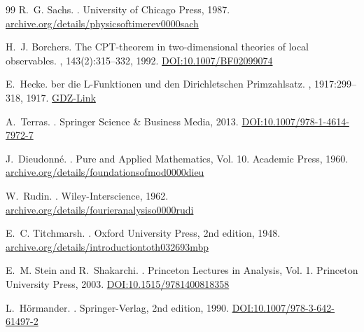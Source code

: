 \documentclass{article}
\numberwithin{equation}{section}
\theoremstyle{plain}
\theoremstyle{definition}
\theoremstyle{remark}
\begin{document}
\begin{thebibliography}{99}
R.~G. Sachs.
.
\newblock University of Chicago Press, 1987.
\href{https://archive.org/details/physicsoftimerev0000sach}{archive.org/details/physicsoftimerev0000sach}

H.~J. Borchers.
\newblock The CPT-theorem in two-dimensional theories of local observables.
, 143(2):315--332, 1992.
\href{https://doi.org/10.1007/BF02099074}{DOI:10.1007/BF02099074}

E.~Hecke.
ber die L-Funktionen und den Dirichletschen Primzahlsatz.
, 1917:299--318, 1917.
\href{http://resolver.sub.uni-goettingen.de/purl?GDZPPN002504953}{GDZ-Link}

A.~Terras.
.
\newblock Springer Science \& Business Media, 2013.
\href{https://doi.org/10.1007/978-1-4614-7972-7}{DOI:10.1007/978-1-4614-7972-7}

J.~Dieudonn{\'e}.
.
\newblock Pure and Applied Mathematics, Vol. 10. Academic Press, 1960.
\href{https://archive.org/details/foundationsofmod0000dieu}{archive.org/details/foundationsofmod0000dieu}

W.~Rudin.
.
\newblock Wiley-Interscience, 1962.
\href{https://archive.org/details/fourieranalysiso0000rudi}{archive.org/details/fourieranalysiso0000rudi}

E.~C. Titchmarsh.
.
\newblock Oxford University Press, 2nd edition, 1948.
\href{https://archive.org/details/introductiontoth032693mbp}{archive.org/details/introductiontoth032693mbp}

E.~M. Stein and R.~Shakarchi.
.
\newblock Princeton Lectures in Analysis, Vol. 1. Princeton University Press, 2003.
\href{https://doi.org/10.1515/9781400818358}{DOI:10.1515/9781400818358}

L.~H{\"o}rmander.
.
\newblock Springer-Verlag, 2nd edition, 1990.
\href{https://doi.org/10.1007/978-3-642-61497-2}{DOI:10.1007/978-3-642-61497-2}


\end{thebibliography}
\end{document}
